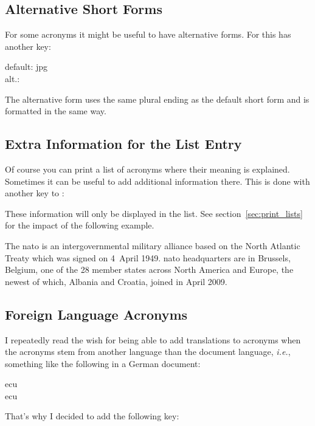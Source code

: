 \documentclass[DIV10,toc=index,toc=bib,hyperfootnotes=false]{cnpkgdoc}
\begin{document}
\subsection{Alternative Short Forms}
For some acronyms it might be useful to have alternative forms. For this
 has another key:
\begin{beschreibung}
\end{beschreibung}
\begin{beispiel}
 default: \acs{jpg} \\
 alt.: 
\end{beispiel}
The alternative form uses the same plural ending as the default short form and
is formatted in the same way.

\subsection{Extra Information for the List Entry}
Of course you can print a list of acronyms where their meaning is explained.
Sometimes it can be useful to add additional information there. This is done with
another key to :
\begin{beschreibung}
\end{beschreibung}
These information will only be displayed in the list. See section~\ref{sec:print_lists}
for the impact of the following example.

\begin{beispiel}
 The \ac{nato} is an intergovernmental military alliance based on the
 North Atlantic Treaty which was signed on 4~April 1949. \ac{nato}
 headquarters are in Brussels, Belgium, one of the 28 member states
 across North America and Europe, the newest of which, Albania and
 Croatia, joined in April 2009.
\end{beispiel}

\subsection{Foreign Language Acronyms}\label{ssec:foreign}
\noindent{}I repeatedly read the wish for being able to add
translations to acronyms when the acronyms stem from another language than
the document language, \textit{i.e.}, something like the following in a German
document:
\begin{beispiel}
 \ac{ecu}\\
 \ac{ecu}
\end{beispiel}
That's why I decided to add the following key:
\begin{beschreibung}
\end{beschreibung}
\end{document}
